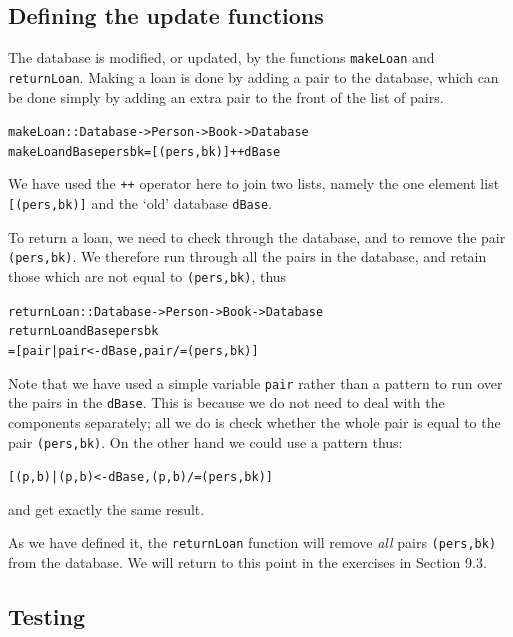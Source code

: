 \subsection*{Defining the update functions}

The database is modified, or updated, by the functions \texttt{makeLoan}
and
\texttt{returnLoan}.
Making a loan is done by adding a pair to the database, which can be done
simply by adding an extra pair to the front of the list of pairs.
\begin{alltt}
makeLoan   :: Database -> Person -> Book -> Database
makeLoan dBase pers bk = [ (pers,bk) ] ++ dBase
\end{alltt}
We have used the \texttt{++}\minx{++} operator here to join two
lists, namely 
the one element list \texttt{[(pers,bk)]} and the `old' database
\texttt{dBase}.

To return a loan, we need to check through the database, and to remove the
pair \texttt{(pers,bk)}. We therefore run through all the pairs in the
database, and retain those which are not equal to \texttt{(pers,bk)}, thus
\begin{alltt}
returnLoan   :: Database -> Person -> Book -> Database
returnLoan dBase pers bk
  = [ pair | pair <- dBase , pair /= (pers,bk) ]
\end{alltt}
Note that we have used a simple variable \texttt{pair} rather than a
pattern to run over the pairs in the \texttt{dBase}. This is because we
do not need to deal with the components separately; all we do is check
whether the whole pair is equal to the pair \texttt{(pers,bk)}. On the
other hand we could use a pattern thus:
\begin{alltt}
[ (p,b) | (p,b) <- dBase , (p,b) /= (pers,bk) ]
\end{alltt}
and get exactly the same result.

As we have defined it, the \texttt{returnLoan} function will remove {\em
all\/} pairs \texttt{(pers,bk)} from the database. We will return to
this point in the exercises in Section 9.3.


\subsection*{Testing}

